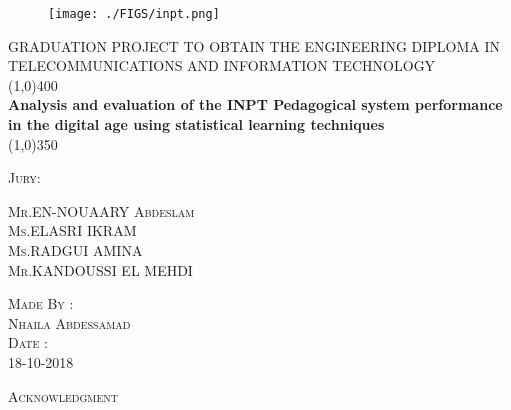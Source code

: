 \documentclass[12pt]{extreport}
\begin{document}
\begin{titlepage}
	
\pagestyle{fancy}
\fancyhf{}


\begin{center}


\begin{figure}[H]
	\centering
	\texttt{[image: ./FIGS/inpt.png]}
	\label{fig:81}
\end{figure}

\textsc{\large GRADUATION PROJECT TO OBTAIN THE ENGINEERING DIPLOMA IN TELECOMMUNICATIONS AND INFORMATION TECHNOLOGY  }\\

\line(1,0){400}\\
[0.25in]
\Large{\bfseries Analysis and evaluation of the INPT Pedagogical system performance in the digital age using statistical learning techniques }\\
[2mm]
\line(1,0){350}\\
[1.5cm]

\end{center}


\begin{flushleft}
	\begin{flushleft}
		\textsc{\LARGE Jury: }\\
	\end{flushleft}	
\textsc{\large Mr.EN-NOUAARY Abdeslam }\\
\textsc{\large Ms.ELASRI IKRAM}\\
\textsc{\large Ms.RADGUI AMINA }\\
\textsc{\large Mr.KANDOUSSI EL MEHDI}\\
\end{flushleft}

\begin{flushright}	
	\textsc{\large Made By :{} {} {} {} {} {}  {} {} }\\	
	\textsc{Nhaila Abdessamad }\\
	\textsc{\large Date : {} {} {} {} {} {} {} {} {} {} {}  {}}\\	
	\textsc{18-10-2018 {} {} {} {} {} {} {} {} {} {} {} {} {} {}}\\	
\end{flushright}

\end{titlepage}


\newpage
\thispagestyle{empty}
\begin{center}
\textsc{\LARGE Acknowledgment}\\
[1.5cm]
\end{center}
\end{document}
